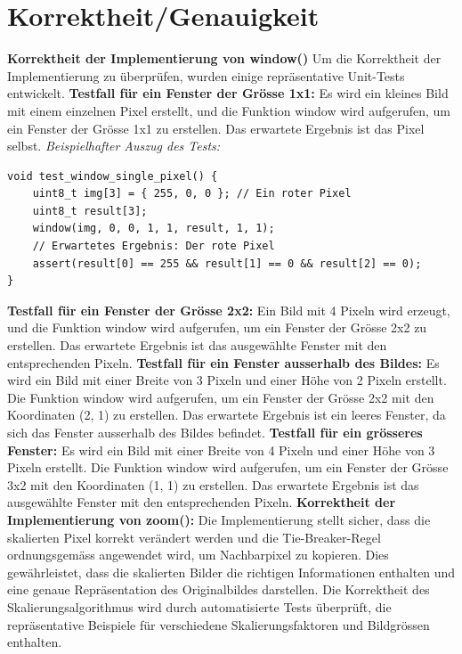 \documentclass[course=erap]{aspdoc}
\begin{document}
\section{Korrektheit/Genauigkeit}
{\textbf{Korrektheit der Implementierung von window()}}
\newline Um die Korrektheit der Implementierung zu überprüfen, wurden einige repräsentative Unit-Tests entwickelt.\newline
\textbf{Testfall für ein Fenster der Grösse 1x1:}\hspace{0.5cm} Es wird ein kleines Bild mit einem einzelnen Pixel erstellt, und die Funktion window wird aufgerufen, um ein Fenster der Grösse 1x1 zu erstellen. Das erwartete Ergebnis ist das Pixel selbst.
\newline \emph{Beispielhafter Auszug des Tests:}
\begin{lstlisting}
void test_window_single_pixel() {
    uint8_t img[3] = { 255, 0, 0 }; // Ein roter Pixel
    uint8_t result[3];
    window(img, 0, 0, 1, 1, result, 1, 1);
    // Erwartetes Ergebnis: Der rote Pixel
    assert(result[0] == 255 && result[1] == 0 && result[2] == 0);
}
\end{lstlisting}
\textbf{Testfall für ein Fenster der Grösse 2x2:}\hspace{0.5cm} Ein Bild mit 4 Pixeln wird erzeugt, und die Funktion window wird aufgerufen, um ein Fenster der Grösse 2x2 zu erstellen. Das erwartete Ergebnis ist das ausgewählte Fenster mit den entsprechenden Pixeln.\newline 
\textbf{Testfall für ein Fenster ausserhalb des Bildes:}\hspace{0.5cm} Es wird ein Bild mit einer Breite von 3 Pixeln und einer Höhe von 2 Pixeln erstellt. Die Funktion window wird aufgerufen, um ein Fenster der Grösse 2x2 mit den Koordinaten (2, 1) zu erstellen. Das erwartete Ergebnis ist ein leeres Fenster, da sich das Fenster ausserhalb des Bildes befindet.\newline 
\textbf{Testfall für ein grösseres Fenster:}\hspace{0.5cm} Es wird ein Bild mit einer Breite von 4 Pixeln und einer Höhe von 3 Pixeln erstellt. Die Funktion window wird aufgerufen, um ein Fenster der Grösse 3x2 mit den Koordinaten (1, 1) zu erstellen. Das erwartete Ergebnis ist das ausgewählte Fenster mit den entsprechenden Pixeln.\newline 
{\textbf{Korrektheit der Implementierung von zoom():}}\hspace{0.5cm}
Die Implementierung stellt sicher, dass die skalierten Pixel korrekt verändert werden und die Tie-Breaker-Regel ordnungsgemäss angewendet wird, um Nachbarpixel zu kopieren. Dies gewährleistet, dass die skalierten Bilder die richtigen Informationen enthalten und eine genaue Repräsentation des Originalbildes darstellen. Die Korrektheit des Skalierungsalgorithmus wird durch automatisierte Tests überprüft, die repräsentative Beispiele für verschiedene Skalierungsfaktoren und Bildgrössen enthalten. \\\\
\end{document}
